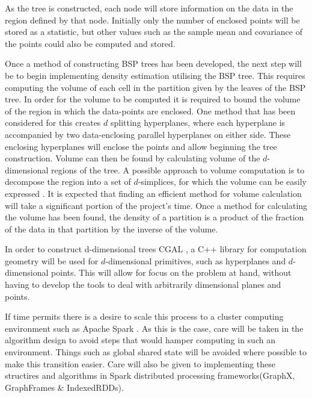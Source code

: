 \documentclass[a4paper, 10pt]{report} %
\begin{document}
As the tree is constructed, each node will store information on the data in the region defined by that node. Initially only the number of enclosed points will be stored as a statistic, but other values such as the sample mean and covariance of the points could also be computed and stored. %

Once a method of constructing BSP trees has been developed, the next step will be to begin implementing density estimation utilising the BSP tree. This requires computing the volume of each cell in the partition given by the leaves of the BSP tree.
In order for the volume to be computed it is required to bound the volume of the region in which the data-points are enclosed. One method that has been considered for this creates $d$ splitting hyperplanes, where each hyperplane is accompanied by two data-enclosing parallel hyperplanes on either side. These enclosing hyperplanes will enclose the points and allow beginning the tree construction. Volume can then be found by calculating volume of the $d$-dimensional regions of the tree.
 A possible approach to volume computation is to decompose the region into a set of $d$-simplices, for which the volume can be easily expressed \cite{10.2307/2315353}. It is expected that finding an efficient method for volume calculation will take a significant portion of the project's time.
Once a method for calculating the volume has been found, the density of a partition is a product of the fraction of the data in that partition by the inverse of the volume.


In order to construct d-dimensional trees CGAL \cite{cgal:eb-15b}, a  C++ library for computation geometry will be used for $d$-dimensional primitives, such as hyperplanes and $d$-dimensional points. This will allow for focus on the problem at hand, without having to develop the tools to deal with arbitrarily dimensional planes and points. %

If time permits there is a desire to scale this process to a cluster computing environment such as Apache Spark \cite{Zaharia:2010:SCC:1863103.1863113}. As this is the case, care will be taken in the algorithm design to avoid steps that would hamper computing in such an environment. Things such as global shared state will be avoided where possible to make this transition easier. Care will also be given to implementing these structires and algorithms in Spark distributed processing frameworks(GraphX, GraphFrames \& IndexedRDDs).
\end{document}
